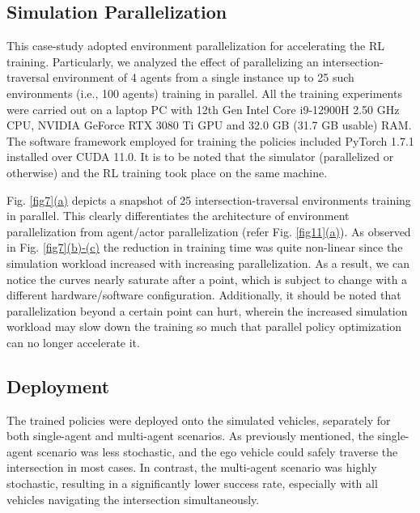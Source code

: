 \documentclass[letterpaper, 10 pt, conference]{ieeeconf}  %
\begin{document}
\subsection{Simulation Parallelization}
\label{Sub-Section: Simulation Parallelization I}

This case-study adopted environment parallelization for accelerating the RL training. Particularly, we analyzed the effect of parallelizing an intersection-traversal environment of 4 agents from a single instance up to 25 such environments (i.e., 100 agents) training in parallel. All the training experiments were carried out on a laptop PC with 12th Gen Intel Core i9-12900H 2.50 GHz CPU, NVIDIA GeForce RTX 3080 Ti GPU and 32.0 GB (31.7 GB usable) RAM. The software framework employed for training the policies included PyTorch 1.7.1 installed over CUDA 11.0. It is to be noted that the simulator (parallelized or otherwise) and the RL training took place on the same machine.

Fig. \hyperref[fig7]{\ref*{fig7}(a)} depicts a snapshot of 25 intersection-traversal environments training in parallel. This clearly differentiates the architecture of environment parallelization from agent/actor parallelization (refer Fig. \hyperref[fig11]{\ref*{fig11}(a)}). As observed in Fig. \hyperref[fig7]{\ref*{fig7}(b)-(c)} the reduction in training time was quite non-linear since the simulation workload increased with increasing parallelization. As a result, we can notice the curves nearly saturate after a point, which is subject to change with a different hardware/software configuration. Additionally, it should be noted that parallelization beyond a certain point can hurt, wherein the increased simulation workload may slow down the training so much that parallel policy optimization can no longer accelerate it.

\subsection{Deployment}
\label{Sub-Section: Deployment I}

The trained policies were deployed onto the simulated vehicles, separately for both single-agent and multi-agent scenarios. As previously mentioned, the single-agent scenario was less stochastic, and the ego vehicle could safely traverse the intersection in most cases. In contrast, the multi-agent scenario was highly stochastic, resulting in a significantly lower success rate, especially with all vehicles navigating the intersection simultaneously.
\end{document}
